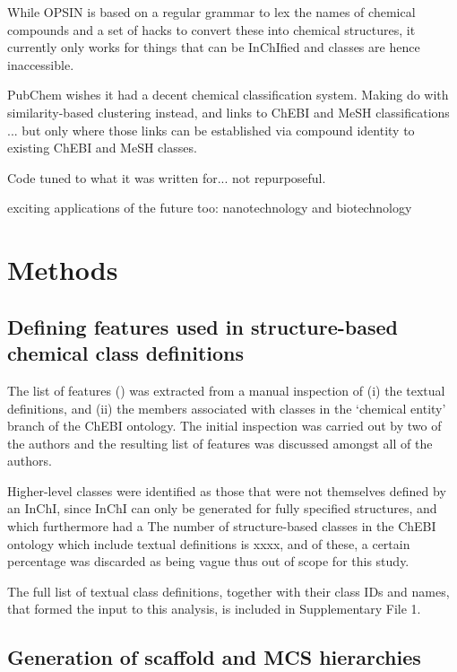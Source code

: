 \documentclass[10pt]{bmc_article}
\newenvironment{bmcformat}{\baselineskip20pt\sloppy\setboolean{publ}{false}}{\baselineskip20pt\sloppy}
\begin{document}
\begin{bmcformat}
While OPSIN is based on a regular grammar to lex the names of chemical compounds and a set of hacks to convert these into chemical structures, it currently only works for things that can be InChIfied and classes are hence inaccessible.

PubChem wishes it had a decent chemical classification system. Making do with similarity-based clustering instead, and links to ChEBI and MeSH classifications ... but only where those links can be established via compound identity to existing ChEBI and MeSH classes. 

Code tuned to what it was written for... not repurposeful. 

exciting applications of the future too: nanotechnology and biotechnology 



\section*{Methods}

\subsection*{Defining features used in structure-based chemical class definitions}

The list of features () was extracted from a manual inspection of (i) the textual definitions, and (ii) the members associated with classes in the `chemical entity' branch of the ChEBI ontology. The initial inspection was carried out by two of the authors and the resulting list of features was discussed amongst all of the authors. 

Higher-level classes were identified as those that were not themselves defined by an InChI, since InChI can only be generated for fully specified structures, and which furthermore had a  The number of structure-based classes in the ChEBI ontology which include textual definitions is xxxx, and of these, a certain percentage was discarded as being vague thus out of scope for this study. 

The full list of textual class definitions, together with their class IDs and names, that formed the input to this analysis, is included in Supplementary File 1. %


\subsection*{Generation of scaffold and MCS hierarchies}


\end{bmcformat}
\end{document}
